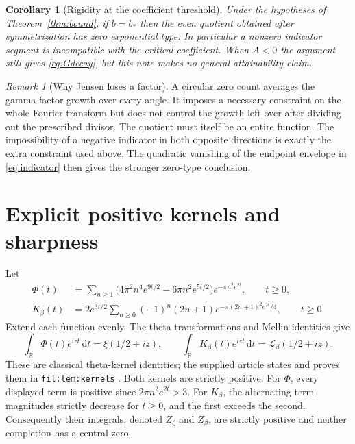 \documentclass[11pt]{article}
\newtheorem{corollary}[theorem]{Corollary}
\theoremstyle{remark}\newtheorem{remark}[theorem]{Remark}
\newcommand{\R}{\mathbb R}\newcommand{\C}{\mathbb C}
\newcommand{\dd}{\,\mathrm d}
\begin{document}
\begin{corollary}[Rigidity at the coefficient threshold]\label{cor:rigidity}
Under the hypotheses of Theorem~\ref{thm:bound}, if $b=b_*$ then the even quotient obtained after symmetrization has zero exponential type. In particular a nonzero indicator segment is incompatible with the critical coefficient. When $A<0$ the argument still gives \eqref{eq:Gdecay}, but this note makes no general attainability claim.
\end{corollary}

\begin{remark}[Why Jensen loses a factor]
A circular zero count averages the gamma-factor growth over every angle. It imposes a necessary constraint on the whole Fourier transform but does not control the growth left over after dividing out the prescribed divisor. The quotient must itself be an entire function. The impossibility of a negative indicator in both opposite directions is exactly the extra constraint used above. The quadratic vanishing of the endpoint envelope in \eqref{eq:indicator} then gives the stronger zero-type conclusion.
\end{remark}

\section{Explicit positive kernels and sharpness}

Let
\begin{align*}
 \Phi(t)&=\sum_{n\ge1}\bigl(4\pi^2n^4e^{9t/2}-6\pi n^2e^{5t/2}\bigr)e^{-\pi n^2e^{2t}},\qquad t\ge0,\\
 K_\beta(t)&=2e^{3t/2}\sum_{n\ge0}(-1)^n(2n+1)e^{-\pi(2n+1)^2e^{2t}/4},\qquad t\ge0.
\end{align*}
Extend each function evenly. The theta transformations and Mellin identities give
\begin{equation}\label{eq:kernels}
 \int_\R\Phi(t)e^{izt}\dd t=\xi(1/2+iz),\qquad
 \int_\R K_\beta(t)e^{izt}\dd t=\mathcal L_\beta(1/2+iz).
\end{equation}
These are classical theta-kernel identities; the supplied article states and proves them in \texttt{fil:lem:kernels} \cite{ProveIt,Titchmarsh}. Both kernels are strictly positive. For $\Phi$, every displayed term is positive since $2\pi n^2e^{2t}>3$. For $K_\beta$, the alternating term magnitudes strictly decrease for $t\ge0$, and the first exceeds the second. Consequently their integrals, denoted $Z_\zeta$ and $Z_\beta$, are strictly positive and neither completion has a central zero.
\end{document}
